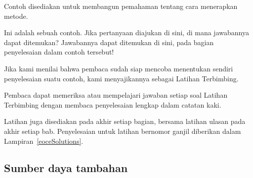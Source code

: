 \noindent%
Contoh disediakan untuk membangun pemahaman tentang cara
menerapkan metode.

\begin{examplewrap}
\begin{nexample}{Ini adalah sebuah contoh.
    Jika pertanyaan diajukan di sini, di mana jawabannya dapat ditemukan?}
  Jawabannya dapat ditemukan di sini, pada bagian penyelesaian
  dalam contoh tersebut!
\end{nexample}
\end{examplewrap}

\noindent%
Jika kami menilai bahwa pembaca sudah siap mencoba menentukan
sendiri penyelesaian suatu contoh, kami menyajikannya sebagai Latihan Terbimbing.

\begin{exercisewrap}
\begin{nexercise}
Pembaca dapat memeriksa atau mempelajari jawaban setiap soal Latihan Terbimbing
dengan membaca penyelesaian lengkap dalam catatan kaki.\footnotemark{}
\end{nexercise}
\end{exercisewrap}

\noindent%
Latihan juga disediakan pada akhir setiap bagian,
bersama latihan ulasan pada akhir setiap bab.
Penyelesaian untuk latihan bernomor ganjil diberikan dalam
Lampiran~\ref{eoceSolutions}.


\subsection*{{\color{oiB}Sumber daya tambahan}}

